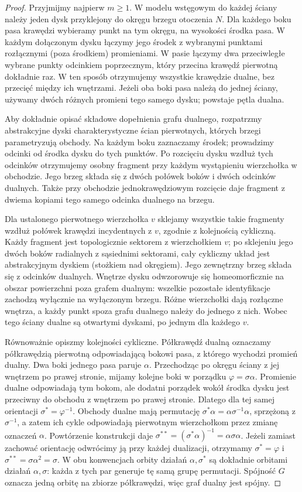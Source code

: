 \begin{proof}
Przyjmijmy najpierw $m\ge1$. W modelu wstęgowym
do każdej ściany należy jeden dysk przyklejony
do okręgu brzegu otoczenia $N$. Dla każdego boku
pasa krawędzi wybieramy punkt na tym okręgu,
na wysokości środka pasa. W każdym dołączonym
dysku łączymy jego środek z wybranymi punktami
rozłącznymi (poza środkiem) promieniami.
W pasie łączymy dwa przeciwległe wybrane punkty
odcinkiem poprzecznym, który przecina krawędź
pierwotną dokładnie raz. W ten sposób otrzymujemy
wszystkie krawędzie dualne, bez przecięć między
ich wnętrzami. Jeżeli oba boki pasa należą do
jednej ściany, używamy dwóch różnych promieni
tego samego dysku; powstaje pętla dualna.

Aby dokładnie opisać składowe dopełnienia grafu dualnego,
rozpatrzmy abstrakcyjne dyski charakterystyczne ścian
pierwotnych, których brzegi parametryzują obchody.
Na każdym boku zaznaczamy środek; prowadzimy odcinki
od środka dysku do tych punktów. Po rozcięciu
dysku wzdłuż tych odcinków otrzymujemy osobny
fragment przy każdym wystąpieniu wierzchołka
w obchodzie. Jego brzeg składa się z dwóch
połówek boków i dwóch odcinków dualnych.
Także przy obchodzie jednokrawędziowym rozcięcie
daje fragment z dwiema kopiami tego samego
odcinka dualnego na brzegu.

Dla ustalonego pierwotnego wierzchołka $v$ sklejamy
wszystkie takie fragmenty wzdłuż połówek krawędzi
incydentnych z $v$, zgodnie z kolejnością cykliczną.
Każdy fragment jest topologicznie sektorem z wierzchołkiem
$v$; po sklejeniu jego dwóch boków radialnych
z sąsiednimi sektorami, cały cykliczny układ jest
abstrakcyjnym dyskiem (stożkiem nad okręgiem).
Jego zewnętrzny brzeg składa się z odcinków dualnych.
Wnętrze dysku odwzorowuje się homeomorficznie na
obszar powierzchni poza grafem dualnym: wszelkie pozostałe
identyfikacje zachodzą wyłącznie na wyłączonym brzegu.
Różne wierzchołki dają rozłączne wnętrza, a każdy
punkt spoza grafu dualnego należy do jednego z nich.
Wobec tego ściany dualne są otwartymi dyskami,
po jednym dla każdego $v$.

Równoważnie opiszmy kolejności cykliczne. Półkrawędź
dualną oznaczamy półkrawędzią pierwotną odpowiadającą
bokowi pasa, z którego wychodzi promień dualny.
Dwa boki jednego pasa paruje $\alpha$.
Przechodząc po okręgu ściany z jej wnętrzem
po prawej stronie, mijamy kolejne boki w porządku
$\varphi=\sigma\alpha$. Promienie dualne
odpowiadają tym bokom, ale dodatni porządek
wokół środka dysku jest przeciwny do obchodu
z wnętrzem po prawej stronie. Dlatego dla
tej samej orientacji $\sigma^*=\varphi^{-1}$.
Obchody dualne mają permutację
$\sigma^*\alpha=\alpha\sigma^{-1}\alpha$,
sprzężoną z $\sigma^{-1}$, a zatem ich cykle
odpowiadają pierwotnym wierzchołkom przez
zmianę oznaczeń $\alpha$. Powtórzenie konstrukcji
daje $\sigma^{**}=(\sigma^*\alpha)^{-1}
=\alpha\sigma\alpha$. Jeżeli zamiast zachować
orientację odwrócimy ją przy każdej dualizacji,
otrzymamy $\sigma^*=\varphi$ i
$\sigma^{**}=\sigma\alpha^2=\sigma$.
W obu konwencjach orbity działań
$\alpha,\sigma^*$ są dokładnie orbitami
działań $\alpha,\sigma$: każda z tych par
generuje tę samą grupę permutacji. Spójność $G$ oznacza jedną orbitę
na zbiorze półkrawędzi, więc graf dualny jest spójny.


\end{proof}
